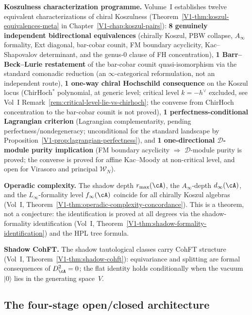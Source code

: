 \medskip\noindent
\textbf{Koszulness characterization programme.}\enspace
Volume~I establishes twelve equivalent characterizations of
chiral Koszulness
(Theorem~\ref*{V1-thm:koszul-equivalences-meta} in
Chapter~\ref*{V1-chap:koszul-pairs}):
\textbf{8 genuinely independent bidirectional equivalences}
(chirally Koszul, PBW collapse, $A_\infty$ formality,
Ext diagonal, bar-cobar counit, FM boundary acyclicity,
Kac--Shapovalov determinant, and the genus-$0$ clause of
FH concentration),
\textbf{1 Barr--Beck--Lurie restatement}
of the bar-cobar counit quasi-isomorphism via the standard
comonadic reduction (an $\infty$-categorical reformulation,
not an independent route),
\textbf{1 one-way chiral Hochschild consequence}
on the Koszul locus (ChirHoch${}^*$ polynomial, at generic level;
critical level $k=-h^\vee$ excluded, see Vol~I
Remark~\ref*{rem:critical-level-lie-vs-chirhoch}; the converse
from ChirHoch concentration to the bar-cobar counit is not proved),
\textbf{1 perfectness-conditional Lagrangian criterion}
(Lagrangian complementarity, pending
perfectness/nondegeneracy; unconditional for the standard
landscape by Proposition~\ref*{V1-prop:lagrangian-perfectness}),
and
\textbf{1 one-directional $\mathcal{D}$-module purity implication}
(FM boundary acyclicity $\Rightarrow$
$\mathcal{D}$-module purity is proved; the converse is proved for
affine Kac--Moody at non-critical level, and open for Virasoro
and principal $\mathcal{W}_N$).

\medskip\noindent
\textbf{Operadic complexity.}\enspace
The shadow depth $r_{\max}(\cA)$, the $A_\infty$-depth
$d_\infty(\cA)$, and the $L_\infty$-formality level
$f_\infty(\cA)$ coincide for all chirally Koszul algebras
(Vol~I, Theorem~\ref*{V1-thm:operadic-complexity-concordance}).
This is a theorem, not a conjecture: the identification is
proved at all degrees via the shadow-formality identification
(Vol~I, Theorem~\ref*{V1-thm:shadow-formality-identification})
and the HPL tree formula.

\medskip\noindent
\textbf{Shadow CohFT.}\enspace
The shadow tautological classes carry CohFT structure
(Vol~I, Theorem~\ref*{V1-thm:shadow-cohft}):
equivariance and splitting are formal consequences of
$D_\cA^2 = 0$; the flat identity holds conditionally
when the vacuum $|0\rangle$ lies in the generating
space~$V$.

\subsection{The four-stage open/closed architecture}

